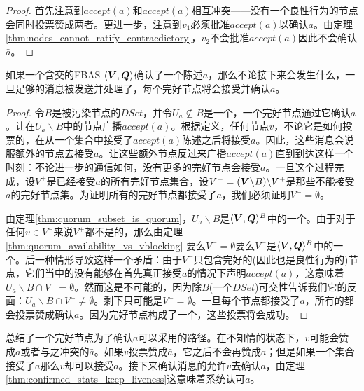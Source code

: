 \begin{proof}
	首先注意到$accept(a)$和$accept(\bar a)$相互冲突——没有一个良性行为的节点会同时投票赞成两者。更进一步，注意到$v_1$必须批准$accept(a)$以确认$a$。由定理\ref{thm:nodes_cannot_ratify_contracdictory}，$v_2$不会批准$accept(\bar a)$因此不会确认$\bar a$。
\end{proof}

\begin{theorem}\label{thm:confirmed_stats_keep_liveness}
	如果一个含{\quorum}交的FBAS $\langle{\bm V},{\bm Q}\rangle$确认了一个陈述$a$，那么不论接下来会发生什么，一旦足够的消息被发送并处理了，每个完好节点将会接受并确认$a$。
\end{theorem}

\begin{proof}
	令$B$是被污染节点的$DSet$，并令$U_a\not \subseteq B$是一个{\quorum}，一个完好节点通过它确认$a$。让在$U_a\backslash B$中的节点广播$accept(a)$。根据定义，任何节点$v$，不论它是如何投票的，在从一个{\vblock}集合中接受了$accept(a)$陈述之后将接受$a$。因此，这些消息会说服额外的节点去接受$a$。让这些额外节点反过来广播$accept(a)$直到到达这样一个时刻：不论进一步的通信如何，没有更多的完好节点会接受$a$。一旦这个过程完成，设$V^+$是已经接受$a$的所有完好节点集合，设$V^-=({\bm V}\backslash B)\backslash V^+$是那些不能接受$a$的完好节点集。为证明所有的完好节点都接受了$a$，我们必须证明$V^-=\emptyset$。

	由定理\ref{thm:quorum_subset_is_quorum}，$U_a\backslash B$是$\langle{\bm V},{\bm Q}\rangle^{B}$中的一个{\quorum}。由于对于任何$v\in V^-$来说$V^+$都不是{\vblock}的，那么由定理\ref{thm:quorum_availability_vs_vblocking} 要么$V^-=\emptyset$要么$V^-$是$\langle{\bm V},{\bm Q}\rangle^{B}$中的一个{\quorum}。后一种情形导致这样一个矛盾：由于$V^-$只包含完好的(因此也是良性行为的)节点，它们当中的没有能够在首先真正接受$a$的情况下声明$accept(a)$，这意味着$U_a\backslash B\cap V^-=\emptyset$。然而这是不可能的，因为除$B$(一个$DSet$){\quorum}可交性告诉我们它的反面：$U_a\backslash B\cap V^-\neq\emptyset$。剩下只可能是$V^-=\emptyset$。一旦每个节点都接受了$a$，所有的都会投票赞成确认$a$。因为完好节点构成了一个{\quorum}，这些投票将会成功。
\end{proof}

总结了一个完好节点为了确认$a$可以采用的路径。在不知情的状态下，$v$可能会赞成$a$或者与之冲突的$\bar a$。如果$v$投票赞成$\bar a$，它之后不会再赞成$a$；但是如果一个{\vblock}集合接受了$a$那么$v$却可以接受$a$。接下来确认消息的{\quorum}允许$v$去确认$a$，由定理\ref{thm:confirmed_stats_keep_liveness}这意味着系统认可$a$。